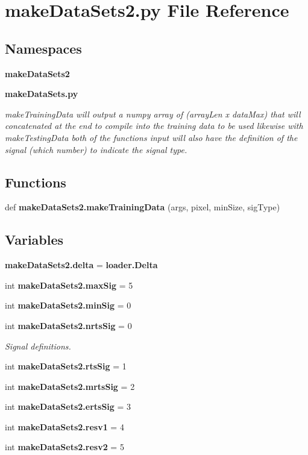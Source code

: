 \section{make\+Data\+Sets2.\+py File Reference}
\label{make_data_sets2_8py}
\subsection*{Namespaces}
\begin{DoxyCompactItemize}
\item 
 \textbf{ make\+Data\+Sets2}
\item 
 \textbf{ make\+Data\+Sets.\+py}
\begin{DoxyCompactList}\small\item\em make\+Training\+Data will output a numpy array of (array\+Len x data\+Max) that will concatenated at the end to compile into the training data to be used likewise with make\+Testing\+Data both of the functions input will also have the definition of the signal (which number) to indicate the signal type. \end{DoxyCompactList}\end{DoxyCompactItemize}
\subsection*{Functions}
\begin{DoxyCompactItemize}
\item 
def \textbf{ make\+Data\+Sets2.\+make\+Training\+Data} (args, pixel, min\+Size, sig\+Type)
\end{DoxyCompactItemize}
\subsection*{Variables}
\begin{DoxyCompactItemize}
\item 
\textbf{ make\+Data\+Sets2.\+delta} = \textbf{ loader.\+Delta}
\item 
int \textbf{ make\+Data\+Sets2.\+max\+Sig} = 5
\item 
int \textbf{ make\+Data\+Sets2.\+min\+Sig} = 0
\item 
int \textbf{ make\+Data\+Sets2.\+nrts\+Sig} = 0
\begin{DoxyCompactList}\small\item\em Signal definitions. \end{DoxyCompactList}\item 
int \textbf{ make\+Data\+Sets2.\+rts\+Sig} = 1
\item 
int \textbf{ make\+Data\+Sets2.\+mrts\+Sig} = 2
\item 
int \textbf{ make\+Data\+Sets2.\+erts\+Sig} = 3
\item 
int \textbf{ make\+Data\+Sets2.\+resv1} = 4
\item 
int \textbf{ make\+Data\+Sets2.\+resv2} = 5
\end{DoxyCompactItemize}

